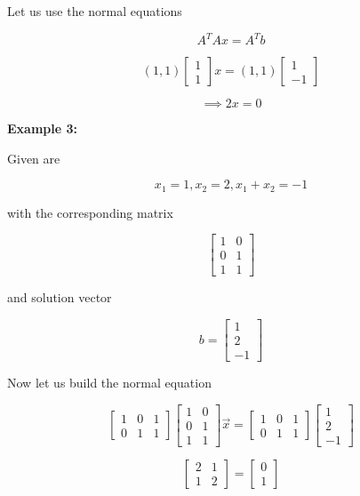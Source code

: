 Let us use the normal equations

\[
	A^T Ax = A^T b
\]

\[
	(1, 1) 
	\begin{bmatrix} 
	1 \\ 
	1
	\end{bmatrix} x
	= 
	(1, 1)
	\begin{bmatrix} 
		1 \\ 
		-1
	\end{bmatrix} 
\]

\[
	\implies 2x = 0
\]

\textbf{Example 3:}

Given are 

\[
	x_1 = 1, x_2 = 2, x_1 + x_2 = -1
\]

with the corresponding matrix

\[
	\begin{bmatrix}
		1 & 0 \\
		0 & 1 \\
		1 & 1  
	\end{bmatrix}
\]

and solution vector 

\[
	b = \begin{bmatrix}
		1 \\
		2 \\
		-1
	\end{bmatrix}
\]

Now let us build the normal equation

\[
	\begin{bmatrix}
	1 & 0 & 1 \\
	0 & 1 & 1
	\end{bmatrix}
	\begin{bmatrix}
	1 & 0 \\
	0 & 1 \\
	1 & 1  
	\end{bmatrix}
	\vec{x}
	=
	\begin{bmatrix}
	1 & 0 & 1 \\
	0 & 1 & 1
	\end{bmatrix}
	\begin{bmatrix}
	1 \\
	2 \\
	-1
	\end{bmatrix}
\]

\[
	\begin{bmatrix}
	2 & 1 \\
	1 & 2
	\end{bmatrix}
	= 
	\begin{bmatrix}
	0 \\
	1
	\end{bmatrix}
\]

